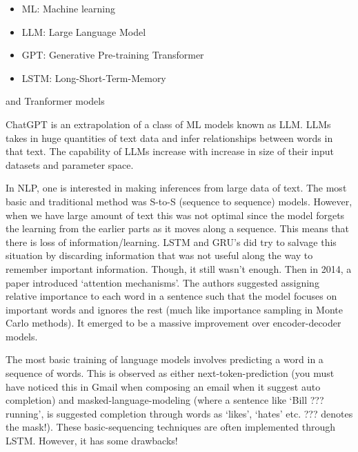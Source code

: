 \documentclass[11pt]{article}
\begin{document}
\begin{itemize}
\item ML: Machine learning
\item LLM: Large Language Model
\item GPT: Generative Pre-training Transformer
\item LSTM: Long-Short-Term-Memory
\end{itemize}

and Tranformer models


ChatGPT is an extrapolation of a class of ML models known as LLM. LLMs takes in 
huge quantities of text data and infer relationships between words in that text. 
The capability of LLMs increase with increase in size of their input datasets and parameter space. 


In NLP, one is interested in making inferences from large data of text. 
The most basic and traditional method was S-to-S (sequence to sequence) models. 
However, when we have large amount of text this was not optimal since the model 
forgets the learning from the earlier parts as it moves along a sequence. This means 
that there is loss of information/learning. LSTM and GRU's did try to salvage this situation 
by discarding information that was not useful along the way to remember important information. 
Though, it still wasn’t enough. Then in 2014, a paper introduced `attention mechanisms'. 
The authors suggested assigning relative importance to each word in a sentence such that the 
model focuses on important words and ignores the rest (much like importance sampling in Monte Carlo methods). 
It emerged to be a massive improvement over encoder-decoder models. 


The most basic training of language models involves predicting a word in a 
sequence of words. This is observed as either next-token-prediction (you must have noticed this in Gmail when composing an email when it suggest auto completion) 
and masked-language-modeling (where a sentence like `Bill ??? running', is suggested completion through words as `likes', `hates' etc. ??? denotes the mask!). 
These basic-sequencing techniques are often implemented through LSTM. However, it has some drawbacks! 
\end{document}
